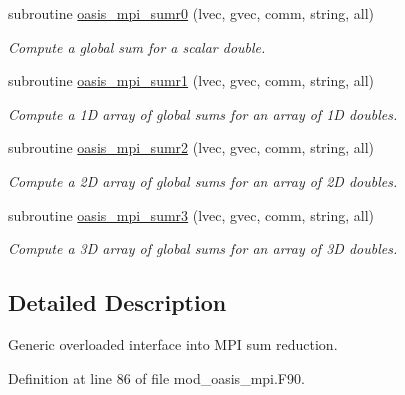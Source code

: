 \begin{DoxyCompactItemize}
subroutine \hyperlink{interfacemod__oasis__mpi_1_1oasis__mpi__sum_aef927bb26681ca81b005940fad26d27f}{oasis\+\_\+mpi\+\_\+sumr0} (lvec, gvec, comm, string, all)
\begin{DoxyCompactList}\small\item\em Compute a global sum for a scalar double. \end{DoxyCompactList}\item 
subroutine \hyperlink{interfacemod__oasis__mpi_1_1oasis__mpi__sum_a509c6561bf7677ca44df5727ec7af8bf}{oasis\+\_\+mpi\+\_\+sumr1} (lvec, gvec, comm, string, all)
\begin{DoxyCompactList}\small\item\em Compute a 1\+D array of global sums for an array of 1\+D doubles. \end{DoxyCompactList}\item 
subroutine \hyperlink{interfacemod__oasis__mpi_1_1oasis__mpi__sum_a45b443ca4b94c71ad7be5e6b653d8b1f}{oasis\+\_\+mpi\+\_\+sumr2} (lvec, gvec, comm, string, all)
\begin{DoxyCompactList}\small\item\em Compute a 2\+D array of global sums for an array of 2\+D doubles. \end{DoxyCompactList}\item 
subroutine \hyperlink{interfacemod__oasis__mpi_1_1oasis__mpi__sum_a31d24332ccc66502fcb78e5f69d19c45}{oasis\+\_\+mpi\+\_\+sumr3} (lvec, gvec, comm, string, all)
\begin{DoxyCompactList}\small\item\em Compute a 3\+D array of global sums for an array of 3\+D doubles. \end{DoxyCompactList}\end{DoxyCompactItemize}


\subsection{Detailed Description}
Generic overloaded interface into M\+P\+I sum reduction. 

Definition at line 86 of file mod\+\_\+oasis\+\_\+mpi.\+F90.



